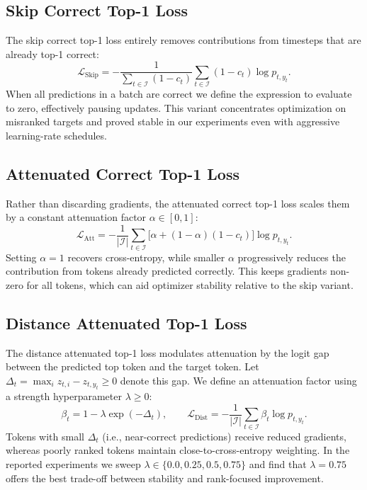 \documentclass{article}
\begin{document}
\subsection{Skip Correct Top-1 Loss}
The skip correct top-1 loss entirely removes contributions from timesteps that are already top-1 correct:
\begin{equation}
\label{eq:skip}
\mathcal{L}_{\mathrm{Skip}} = - \frac{1}{\sum_{t \in \mathcal{I}} (1 - c_t)} \sum_{t \in \mathcal{I}} (1 - c_t) \log p_{t,y_t}.
\end{equation}
When all predictions in a batch are correct we define the expression to evaluate to zero, effectively pausing updates.
This variant concentrates optimization on misranked targets and proved stable in our experiments even with aggressive learning-rate schedules.

\subsection{Attenuated Correct Top-1 Loss}
Rather than discarding gradients, the attenuated correct top-1 loss scales them by a constant attenuation factor $\alpha \in [0,1]$:
\begin{equation}
\label{eq:attenuated}
\mathcal{L}_{\mathrm{Att}} = - \frac{1}{|\mathcal{I}|} \sum_{t \in \mathcal{I}} \big[ \alpha + (1-\alpha)(1 - c_t) \big] \log p_{t,y_t}.
\end{equation}
Setting $\alpha=1$ recovers cross-entropy, while smaller $\alpha$ progressively reduces the contribution from tokens already predicted correctly.
This keeps gradients non-zero for all tokens, which can aid optimizer stability relative to the skip variant.

\subsection{Distance Attenuated Top-1 Loss}
The distance attenuated top-1 loss modulates attenuation by the logit gap between the predicted top token and the target token.
Let $\Delta_t = \max_i z_{t,i} - z_{t,y_t} \ge 0$ denote this gap.
We define an attenuation factor using a strength hyperparameter $\lambda \ge 0$:
\begin{equation}
\label{eq:distance}
\beta_t = 1 - \lambda \exp(-\Delta_t), \qquad \mathcal{L}_{\mathrm{Dist}} = - \frac{1}{|\mathcal{I}|} \sum_{t \in \mathcal{I}} \beta_t \log p_{t,y_t}.
\end{equation}
Tokens with small $\Delta_t$ (i.e., near-correct predictions) receive reduced gradients, whereas poorly ranked tokens maintain close-to-cross-entropy weighting.
In the reported experiments we sweep $\lambda \in \{0.0, 0.25, 0.5, 0.75\}$ and find that $\lambda=0.75$ offers the best trade-off between stability and rank-focused improvement.
\end{document}
